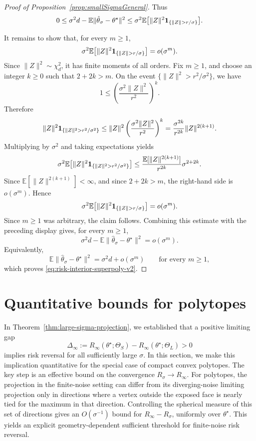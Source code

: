 \documentclass[11pt]{article}
\theoremstyle{plain}
\theoremstyle{definition}
\newcommand{\indicator}{{\bf{1}}}
\newcommand{\E}{\mathbb{E}}
\newcommand{\hattheta}{\hat{\theta}}
\begin{document}
\begin{proof}[Proof of Proposition~\ref{prop:smallSigmaGeneral}]
Thus
\[
0\le \sigma^2 d - \E\|\hattheta_\sigma-\theta^\star\|^2
\le
\sigma^2\E\big[\|Z\|^2\indicator_{\{\|Z\|>r/\sigma\}}\big].
\]


It remains to show that, for every $m\ge 1$,
\[
    \sigma^2
    \E\bigl[
        \|Z\|^2
        \indicator_{\{\|Z\|>r/\sigma\}}
    \bigr]
    =
    o(\sigma^m).
\]
Since $\|Z\|^2\sim\chi_d^2$, it has finite moments of all orders.
Fix $m\ge 1$, and choose an integer $k\ge 0$ such that
$2+2k>m$. On the event $\{\|Z\|^2>r^2/\sigma^2\}$, we have
\[
    1
    \le
    \left(\frac{\sigma^2\|Z\|^2}{r^2}\right)^k .
\]
Therefore
\[
    \|Z\|^2
    \indicator_{\{\|Z\|^2>r^2/\sigma^2\}}
    \le
    \|Z\|^2
    \left(\frac{\sigma^2\|Z\|^2}{r^2}\right)^k
    =
    \frac{\sigma^{2k}}{r^{2k}}\|Z\|^{2(k+1)}.
\]
Multiplying by $\sigma^2$ and taking expectations yields
\[
    \sigma^2
    \E\bigl[
        \|Z\|^2
        \indicator_{\{\|Z\|^2>r^2/\sigma^2\}}
    \bigr]
    \le
    \frac{\E[\|Z\|^{2(k+1)}]}{r^{2k}}
    \sigma^{2+2k}.
\]
Since $\E[\|Z\|^{2(k+1)}]<\infty$, and since $2+2k>m$, the right-hand
side is $o(\sigma^m)$. Hence
\[
    \sigma^2
    \E\bigl[
        \|Z\|^2
        \indicator_{\{\|Z\|>r/\sigma\}}
    \bigr]
    =
    o(\sigma^m).
\]
Since $m\ge1$ was arbitrary, the claim follows. Combining this estimate with the preceding display gives, for every $m\ge1$,
\[
    \sigma^2 d-\E\|\hattheta_\sigma-\theta^\star\|^2
    =
    o(\sigma^m).
\]
Equivalently,
\[
    \E\|\hattheta_\sigma-\theta^\star\|^2
    =
    \sigma^2 d+o(\sigma^m)
    \qquad
    \text{for every } m\ge1,
\]
which proves \eqref{eq:risk-interior-superpoly-v2}.
\end{proof}




\section{Quantitative bounds for polytopes}
\label{sec:quantitative-bounds-polytopes}
In Theorem~\ref{thm:large-sigma-projection}, we established that a positive
limiting gap
\[
    \Delta_\infty
    :=
    R_\infty(\theta^\star;\Theta_S)
    -
    R_\infty(\theta^\star;\Theta_L)
    >
    0
\]
implies risk reversal for all sufficiently large $\sigma$. In this section,
we make this implication quantitative for the special case of compact convex
polytopes. The key step is an effective bound on the convergence
$R_\sigma\to R_\infty$. For polytopes, the projection in the finite-noise
setting can differ from its diverging-noise limiting projection only in directions
where a vertex outside the exposed face is nearly tied for the maximum in that
direction. Controlling the spherical measure of this set of directions gives an
$O(\sigma^{-1})$ bound for $R_\infty-R_\sigma$, uniformly over
$\theta^\star$. This yields an explicit geometry-dependent sufficient threshold for finite-noise risk reversal.
\end{document}
